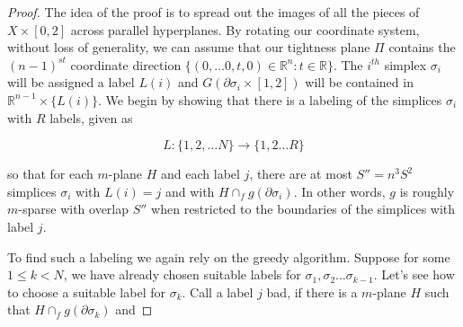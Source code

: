 \documentclass[12pt]{article}
\newcommand{\RR}{\mathbb{R}}
\begin{document}
	
	\begin{proof} 

		
		The idea of the proof is to spread out the images of all the pieces of $X \times [0,2]$ across parallel hyperplanes. By rotating our coordinate system, without loss of generality, we can assume that our tightness plane $\Pi$ contains the $(n-1)^{st}$ coordinate direction $\{(0, \ldots 0, t, 0) \in \RR^n: t \in \RR \}$. The $i^{th}$ simplex $\sigma_i$ will be assigned a label $L(i)$ and $G(\partial \sigma_i \times [1,2])$ will be contained in $\RR^{n-1} \times \{L(i)\}$. We begin by showing that there is a labeling of the simplices $\sigma_i$ with $R$ labels, given as
		
		$$L: \{1, 2, \ldots N\} \to \{1, 2 \ldots R\}$$
		
		\noindent so that for each $m$-plane $H$ and each label $j$, there are at most $S''=n^3S^2$ simplices $\sigma_i$ with $L(i) = j$ and with $H \cap_f g(\partial \sigma_i)$. In other words, $g$ is roughly $m$-sparse with overlap $S''$ when restricted to the boundaries of the simplices with label $j$.
		
		To find such a labeling we again rely on the greedy algorithm. Suppose for some $1 \le k < N$, we have already chosen suitable labels for $\sigma_1, \sigma_2 \ldots \sigma_{k-1}$. Let's see how to choose a suitable label for $\sigma_k$. Call a label $j$ bad, if there is a $m$-plane $H$ such that $H \cap_f g(\partial \sigma_k)$ and
		

\end{proof}
\end{document}
